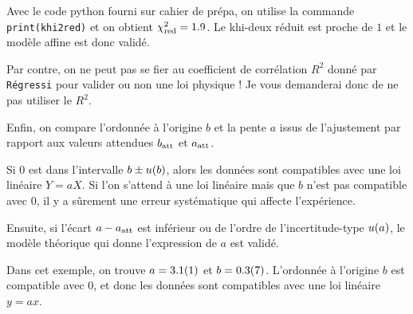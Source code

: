 \begin{liste}
\begin{remarque}
Avec le code python fourni sur cahier de prépa, on utilise la commande \Verb"print(khi2red)" et on obtient $\chi^2_{\rm red} = \SI{1.9}{}$. Le khi-deux réduit est proche de $1$ et le modèle affine est donc validé.
\end{remarque}

\begin{danger}
Par contre, on ne peut pas se fier au coefficient de corrélation $R^2$ donné par \texttt{Régressi} pour valider ou non une loi physique ! Je vous demanderai donc de ne pas utiliser le $R^2$.
\end{danger}

\item Enfin, on compare l’ordonnée à l’origine $b$ et la pente $a$ issus de l’ajustement par rapport aux valeurs attendues $b_{\rm att}$ et $a_{\rm att}$.

Si $0$ est dans l’intervalle $b\pm u(b)$, alors les données sont compatibles avec une loi linéaire $Y=aX$. Si l’on s’attend à une loi linéaire mais que $b$ n’est pas compatible avec $0$, il y a sûrement une erreur systématique qui affecte l’expérience.

 Ensuite, si l’écart $a-a_{\rm att}$ est inférieur ou de l’ordre de l’incertitude-type $u(a)$, le modèle théorique qui donne l’expression de $a$ est validé.


 \begin{remarque}
 Dans cet exemple, on trouve $a = \SI{3.1\pm0.1}{}$ et $b=\SI{0.3\pm0.7}{}$. L'ordonnée à l'origine $b$ est compatible avec $0$, et donc les données sont compatibles avec une loi linéaire $y=ax$.
 \end{remarque}
\end{liste}





